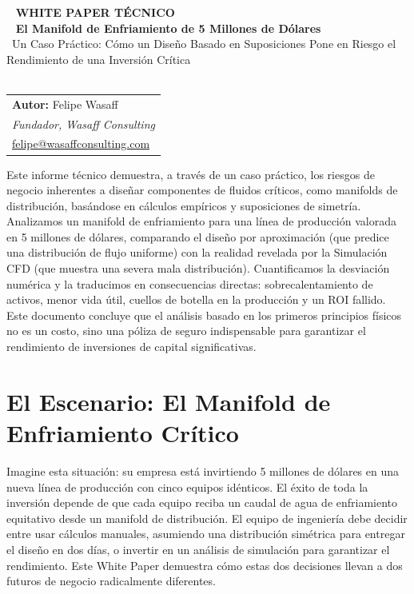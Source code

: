 \documentclass[11pt, a4paper,oneside]{article}
\begin{document}
\sffamily

\
\vspace{1cm}
{\color{WasaffCopper} \large \textbf{WHITE PAPER TÉCNICO}}\\
\
{\color{WasaffNavy} \huge \textbf{El Manifold de Enfriamiento de 5 Millones de Dólares}}\\
\
{\Large Un Caso Práctico: Cómo un Diseño Basado en Suposiciones Pone en Riesgo el Rendimiento de una Inversión Crítica}\\
\
\vspace{1cm}
\
\rmfamily
\begin{tabular}{@{}p{14cm}}
    \textbf{Autor:} Felipe Wasaff \\
    \textit{Fundador, Wasaff Consulting} \\
    \href{mailto:felipe@wasaffconsulting.com}{felipe@wasaffconsulting.com} \\
\end{tabular}
\vspace{1cm}

\begin{abstractbox}
    Este informe técnico demuestra, a través de un caso práctico, los riesgos de negocio inherentes a diseñar componentes de fluidos críticos, como manifolds de distribución, basándose en cálculos empíricos y suposiciones de simetría. Analizamos un manifold de enfriamiento para una línea de producción valorada en 5 millones de dólares, comparando el diseño por aproximación (que predice una distribución de flujo uniforme) con la realidad revelada por la Simulación CFD (que muestra una severa mala distribución). Cuantificamos la desviación numérica y la traducimos en consecuencias directas: sobrecalentamiento de activos, menor vida útil, cuellos de botella en la producción y un ROI fallido. Este documento concluye que el análisis basado en los primeros principios físicos no es un costo, sino una póliza de seguro indispensable para garantizar el rendimiento de inversiones de capital significativas.
\end{abstractbox}

\section{El Escenario: El Manifold de Enfriamiento Crítico}
Imagine esta situación: su empresa está invirtiendo 5 millones de dólares en una nueva línea de producción con cinco equipos idénticos. El éxito de toda la inversión depende de que cada equipo reciba un caudal de agua de enfriamiento equitativo desde un manifold de distribución. El equipo de ingeniería debe decidir entre usar cálculos manuales, asumiendo una distribución simétrica para entregar el diseño en dos días, o invertir en un análisis de simulación para garantizar el rendimiento. Este White Paper demuestra cómo estas dos decisiones llevan a dos futuros de negocio radicalmente diferentes.
\end{document}
